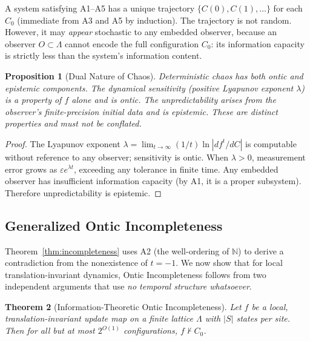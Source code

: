\documentclass[12pt]{article}
\theoremstyle{plain}
\newtheorem{theorem}{Theorem}[section]
\newtheorem{proposition}[theorem]{Proposition}
\theoremstyle{definition}
\theoremstyle{remark}
\newcommand{\Lattice}{\Lambda}
\newcommand{\Natural}{\mathbb{N}}
\begin{document}
A system satisfying A1--A5 has a unique trajectory $\{C(0), C(1), \ldots\}$ for each $C_0$ (immediate from A3 and A5 by induction). The trajectory is not random. However, it may \emph{appear} stochastic to any embedded observer, because an observer $O \subset \Lattice$ cannot encode the full configuration $C_0$: its information capacity is strictly less than the system's information content.

\begin{proposition}[Dual Nature of Chaos]\label{prop:chaos}
Deterministic chaos has both ontic and epistemic components. The dynamical sensitivity (positive Lyapunov exponent $\lambda$) is a property of $f$ alone and is ontic. The unpredictability arises from the observer's finite-precision initial data and is epistemic. These are distinct properties and must not be conflated.
\end{proposition}

\begin{proof}
The Lyapunov exponent $\lambda = \lim_{t \to \infty} (1/t) \ln |df^t/dC|$ is computable without reference to any observer; sensitivity is ontic. When $\lambda > 0$, measurement error grows as $\varepsilon e^{\lambda t}$, exceeding any tolerance in finite time. Any embedded observer has insufficient information capacity (by A1, it is a proper subsystem). Therefore unpredictability is epistemic.
\end{proof}

\subsection{Generalized Ontic Incompleteness}\label{sec:generalized}

Theorem~\ref{thm:incompleteness} uses A2 (the well-ordering of $\Natural$) to derive a contradiction from the nonexistence of $t = -1$. We now show that for local translation-invariant dynamics, Ontic Incompleteness follows from two independent arguments that use \emph{no temporal structure whatsoever}.

\begin{theorem}[Information-Theoretic Ontic Incompleteness]\label{thm:info-incomp}
Let $f$ be a local, translation-invariant update map on a finite lattice $\Lattice$ with $|S|$ states per site. Then for all but at most $2^{O(1)}$ configurations, $f \nvdash C_0$.
\end{theorem}
\end{document}
